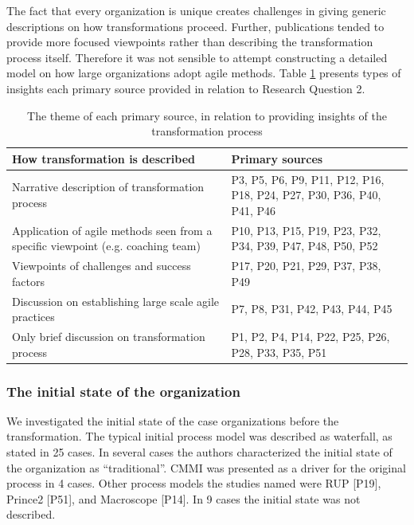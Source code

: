 The fact that every organization is unique creates challenges in giving generic
descriptions on how transformations proceed. Further, publications tended to
provide more focused viewpoints rather than describing the transformation
process itself. Therefore it was not sensible to attempt constructing a detailed
model on how large organizations adopt agile methods.
Table \ref{table:transformation_descriptiontypes} presents types of insights
each primary source provided in relation to Research Question 2.

\begin{table}[h]
    \centering
    \begin{tabular}{ >{\raggedright\arraybackslash}p{}
                     >{\raggedright\arraybackslash}p{} }
        \toprule
        How transformation is described   &  Primary sources  \\
        \midrule
        Narrative description of transformation process &
                P3, P5, P6, P9, P11, P12, P16, P18,
                P24, P27, P30, P36, P40, P41, P46   \\
        Application of agile methods seen from a specific viewpoint (e.g. coaching team) &
                P10, P13, P15, P19, P23, P32, P34,
                P39, P47, P48, P50, P52    \\
        Viewpoints of challenges and success factors  &
                P17, P20, P21, P29, P37, P38, P49   \\
        Discussion on establishing large scale agile practices  &
                P7, P8, P31, P42, P43, P44, P45   \\
        Only brief discussion on transformation process  &
                P1, P2, P4, P14, P22, P25, P26, P28, P33, P35, P51  \\
        \bottomrule
    \end{tabular}
    \caption{The theme of each primary source, in relation to providing
             insights of the transformation process}
    \label{table:transformation_descriptiontypes}
\end{table}


\subsubsection{The initial state of the organization}

We investigated the initial state of the case organizations before the
transformation. The typical initial process model was described as waterfall, as
stated in 25 cases. In several cases the authors characterized the initial state
of the organization as ``traditional''. CMMI was presented as a driver for the
original process in 4 cases. Other process models the studies named were RUP
[P19], Prince2 [P51], and Macroscope [P14]. In 9 cases the initial state was not
described.

